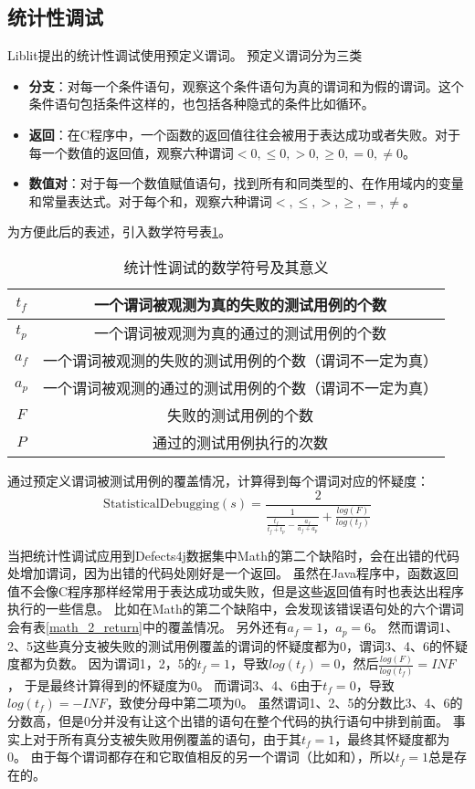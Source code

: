 \subsection{统计性调试}

Liblit\parencite{Liblit2005Scalable}提出的统计性调试使用预定义谓词。
预定义谓词分为三类
\begin{itemize}
\item \textbf{分支}：对每一个条件语句，观察这个条件语句为真的谓词和为假的谓词。这个条件语句包括条件这样的，也包括各种隐式的条件比如循环。
\item \textbf{返回}：在C程序中，一个函数的返回值往往会被用于表达成功或者失败。对于每一个数值的返回值，观察六种谓词$< 0, \le 0, > 0, \ge 0, = 0, \ne 0$。
\item \textbf{数值对}：对于每一个数值赋值语句，找到所有和同类型的、在作用域内的变量和常量表达式。对于每个和，观察六种谓词$<, \le, >, \ge, =, \ne$。
\end{itemize}
为方便此后的表述，引入数学符号表\ref{state_symbol}。
\begin{table}
\centering
\begin{tabular}{|c|c|}
\hline
$t_f$ & 一个谓词被观测为真的失败的测试用例的个数 \\
\hline
$t_p$ & 一个谓词被观测为真的通过的测试用例的个数 \\
\hline
$a_f$ & 一个谓词被观测的失败的测试用例的个数（谓词不一定为真）\\
\hline
$a_p$ & 一个谓词被观测的通过的测试用例的个数（谓词不一定为真）\\
\hline
$F$ & 失败的测试用例的个数 \\
\hline
$P$ & 通过的测试用例执行的次数 \\
\hline
\end{tabular}
\caption{统计性调试的数学符号及其意义}
\label{state_symbol}
\end{table}

通过预定义谓词被测试用例的覆盖情况，计算得到每个谓词对应的怀疑度：
$$
\mathrm{StatisticalDebugging}(s) = \frac{2}{\frac{1}{\frac{t_f}{t_f + t_p} - \frac{a_f}{a_f + a_p}} + \frac{log(F)}{log(t_f)}}
$$

当把统计性调试应用到Defects4j数据集中Math的第二个缺陷时，会在出错的代码处增加谓词，因为出错的代码处刚好是一个返回。
虽然在Java程序中，函数返回值不会像C程序那样经常用于表达成功或失败，但是这些返回值有时也表达出程序执行的一些信息。
比如在Math的第二个缺陷中，会发现该错误语句处的六个谓词会有表\ref{math_2_return}中的覆盖情况。
另外还有$a_f = 1$，$a_p = 6$。
然而谓词1、2、5这些真分支被失败的测试用例覆盖的谓词的怀疑度都为0，谓词3、4、6的怀疑度都为负数。
因为谓词1，2，5的$t_f = 1$，导致$log(t_f) = 0$，然后$\frac{log(F)}{log(t_f)} = INF$，
于是最终计算得到的怀疑度为0。
而谓词3、4、6由于$t_f = 0$，导致$log(t_f) = -INF$，致使分母中第二项为0。
虽然谓词1、2、5的分数比3、4、6的分数高，但是0分并没有让这个出错的语句在整个代码的执行语句中排到前面。
事实上对于所有真分支被失败用例覆盖的语句，由于其$t_f = 1$，最终其怀疑度都为0。
由于每个谓词都存在和它取值相反的另一个谓词（比如和），所以$t_f = 1$总是存在的。

